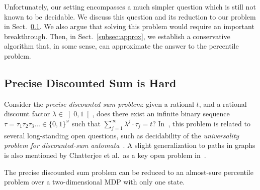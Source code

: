 \documentclass{llncs}
\newcommand{\discount}{\ensuremath{\lambda} }
\begin{document}
Unfortunately, our setting encompasses a much simpler question which is still not known to be decidable. We discuss this question and its reduction to our problem in Sect.~\ref{subsec:precise}. We also argue that solving this problem would require an important breakthrough. Then, in Sect.~\ref{subsec:approx}, we establish a conservative algorithm that, in some sense, can approximate the answer to the percentile problem.
	
\subsection{Precise Discounted Sum is Hard}
\label{subsec:precise}

Consider the \textit{precise discounted sum problem}: given a rational $t$, and a rational discount factor $\discount \in \left] 0, 1\right[ $, does there exist an infinite binary sequence $\tau = \tau_{1}\tau_{2}\tau_{3}\ldots{} \in \{0, 1\}^{\omega}$ such that $\sum_{j = 1}^{\infty} \discount^{j} \cdot \tau_{j} = t$? In~\cite{bokerTDS}, this problem is related to several long-standing open questions, such as decidability of the \textit{universality problem for discounted-sum automata}~\cite{DBLP:journals/corr/BokerH14}. A slight generalization to paths in graphs is also mentioned by Chatterjee et al.~as a key open problem in~\cite{DBLP:conf/lpar/ChatterjeeFW13}.

\begin{lemma}
\label{lem:ds_precise}
The precise discounted sum problem can be reduced to an almost-sure percentile problem over a two-dimensional MDP with only one state.
\end{lemma}
\end{document}
